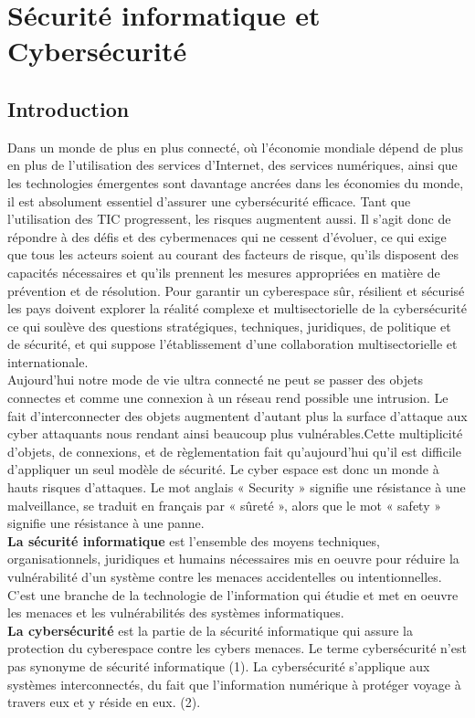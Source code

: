 
\chapter{Sécurité informatique et Cybersécurité} 
\section{Introduction}
\parindent=0.2cm 
Dans un monde de plus en plus connecté, où l’économie mondiale dépend de plus en plus de l’utilisation des services d’Internet, des services numériques, ainsi que les technologies émergentes sont davantage ancrées dans les économies du monde, il est absolument essentiel d'assurer une cybersécurité efficace. Tant que l'utilisation des TIC progressent, les risques augmentent aussi. Il s'agit donc de répondre à des défis et des cybermenaces qui ne cessent d'évoluer, ce qui exige que tous les acteurs soient au courant des facteurs de risque, qu'ils disposent des capacités nécessaires et qu'ils prennent les mesures appropriées en matière de prévention et de résolution. Pour garantir un cyberespace sûr, résilient et sécurisé les pays doivent explorer la réalité complexe et multisectorielle de la cybersécurité ce qui soulève des questions stratégiques, techniques, juridiques, de politique et de sécurité, et qui suppose l'établissement d'une collaboration multisectorielle et internationale.\\

Aujourd’hui notre mode de vie ultra connecté ne peut se passer des objets connectes et comme une connexion à un réseau rend possible une intrusion. Le fait d’interconnecter des objets augmentent d’autant plus la surface d’attaque aux cyber attaquants nous rendant ainsi beaucoup plus vulnérables.Cette multiplicité d’objets, de connexions, et de règlementation fait qu’aujourd’hui qu’il est difficile d’appliquer un seul modèle de sécurité. Le cyber espace est donc un monde à hauts risques d’attaques. Le mot anglais « Security » signifie une résistance à une malveillance, se traduit en français par « sûreté », alors que le mot « safety » signifie une résistance à une panne.\\

\textbf{La sécurité informatique} est l’ensemble des moyens techniques, organisationnels, juridiques et humains nécessaires mis en oeuvre pour réduire la vulnérabilité d’un système contre les menaces accidentelles ou intentionnelles. C’est une branche de la technologie de l’information qui étudie et met en oeuvre les menaces et les vulnérabilités des systèmes informatiques.\\
\textbf{La cybersécurité} est la partie de la sécurité informatique qui assure la protection du cyberespace contre les cybers menaces. Le terme cybersécurité n’est pas synonyme de sécurité informatique (1). La cybersécurité s’applique aux systèmes interconnectés, du fait que l’information numérique à protéger voyage à travers eux et y réside en eux. (2).\\

